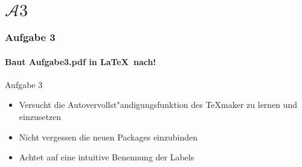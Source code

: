 \section{$\mathcal{A}3$} 
\begin{frame}
\frametitle{Aufgabe 3}
\framesubtitle{Baut Aufgabe3.pdf in \LaTeX ~nach!} 

\begin{block}{Aufgabe 3}
\begin{itemize}
\item Versucht die Autovervollst"andigungsfunktion des \TeX maker zu lernen und einzusetzen
\item Nicht vergessen die neuen Packages einzubinden
\item Achtet auf eine intuitive Benennung der Labels
\end{itemize}
\end{block}
\end{frame}